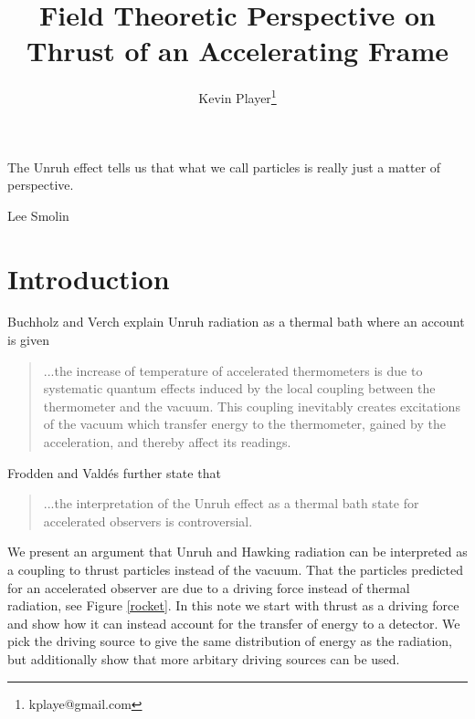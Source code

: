 \documentclass[12pt,a4paper]{article}
\begin{document}
\title{Field Theoretic Perspective on Thrust of an Accelerating Frame}
\author[1]{Kevin Player\footnote{kplaye@gmail.com}}

\maketitle

\epigraph{The Unruh effect tells us that what we call particles is really just a matter of perspective.}{Lee Smolin}


\section{Introduction}
Buchholz and Verch \cite{Buchholz_2016} explain Unruh radiation as a thermal bath where an account is given

\begin{quote}
  ...the increase of temperature of accelerated thermometers is due to systematic quantum effects induced by the local coupling between the thermometer and the vacuum. This coupling inevitably creates excitations of the vacuum which transfer energy to the thermometer, gained by the acceleration, and thereby affect its readings.
\end{quote}
Frodden and Vald{\'{e}}s \cite{Frodden} further state that 
\begin{quote}
...the interpretation of the Unruh effect as a thermal bath state for accelerated observers is controversial.  
\end{quote}
We present an argument that Unruh and Hawking radiation can be interpreted as a coupling to thrust particles instead of the vacuum. That the particles predicted for an accelerated observer are due to a driving force instead of thermal radiation, see Figure \ref{rocket}. In this note we start with thrust as a driving force and show how it can instead account for the transfer of energy to a detector.  We pick the driving source to give the same distribution of energy as the radiation, but additionally show that more arbitary driving sources can be used.
\end{document}

